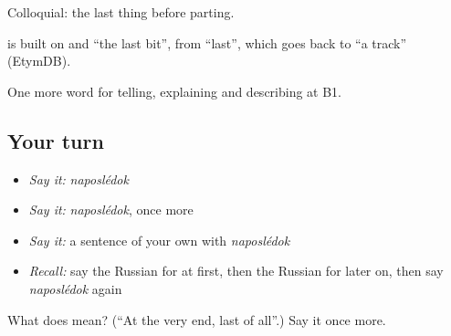 Colloquial: the last thing before parting.

\begin{cousinweb}
\emph{} is built on \emph{} and \emph{} \textquotedblleft{}the last bit\textquotedblright{}, from \emph{} \textquotedblleft{}last\textquotedblright{}, which goes back to \emph{} \textquotedblleft{}a track\textquotedblright{} (EtymDB).
\end{cousinweb}

\begin{grammarlens}[title={What you've built}]
One more word for telling, explaining and describing at B1.
\end{grammarlens}

\subsection*{Your turn}
\begin{itemize}
\raggedright
  \item \emph{Say it:} \emph{naposlédok}
  \item \emph{Say it:} \emph{naposlédok}, once more
  \item \emph{Say it:} a sentence of your own with \emph{naposlédok}
  \item \emph{Recall:} say the Russian for at first, then the Russian for later on, then say \emph{naposlédok} again
\end{itemize}

\begin{tcolorbox}[breakable,colback=teal!4,colframe=teal!35!black,title={Before you move on}]
What does  mean? (\textquotedblleft{}At the very end, last of all\textquotedblright{}.) Say it once more.
\end{tcolorbox}
